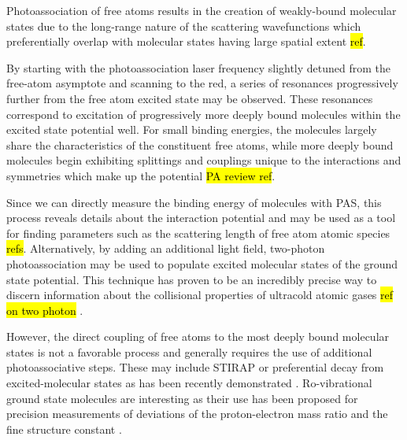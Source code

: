 Photoassociation of free atoms results in the creation of weakly-bound molecular states due to the long-range nature of the scattering wavefunctions which preferentially overlap with molecular states having large spatial extent \hl{ref}.


By starting with the photoassociation laser frequency slightly detuned from the free-atom asymptote and scanning to the red, a series of resonances progressively further from the free atom excited state may be observed.
These resonances correspond to excitation of progressively more deeply bound molecules within the excited state potential well.
For small binding energies, the molecules largely share the characteristics of the constituent free atoms, while more deeply bound molecules begin exhibiting splittings and couplings unique to the interactions and symmetries which make up the potential \hl{PA review ref}.

Since we can directly measure the binding energy of molecules with PAS, this process reveals details about the interaction potential and may be used as a tool for finding parameters such as the scattering length of free atom atomic species \hl{refs}.
Alternatively, by adding an additional light field, two-photon photoassociation may be used to populate excited molecular states of the ground state potential.
This technique has proven to be an incredibly precise way to discern information about the collisional properties of ultracold atomic gases \hl{ref on two photon} \cite{MartinezDeEscobar2008}.

However, the direct coupling of free atoms to the most deeply bound molecular states is not a favorable process and generally requires the use of additional photoassociative steps.
These may include STIRAP or preferential decay from excited-molecular states as has been recently demonstrated \cite{Reinaudi2012, cbc17, Stellmer2012, Ciamei2017}.
Ro-vibrational ground state molecules are interesting as their use has been proposed for precision measurements of deviations of the proton-electron mass ratio \cite{zky08, Kotochigova2009} and the fine structure constant \cite{Beloy2011}. 


